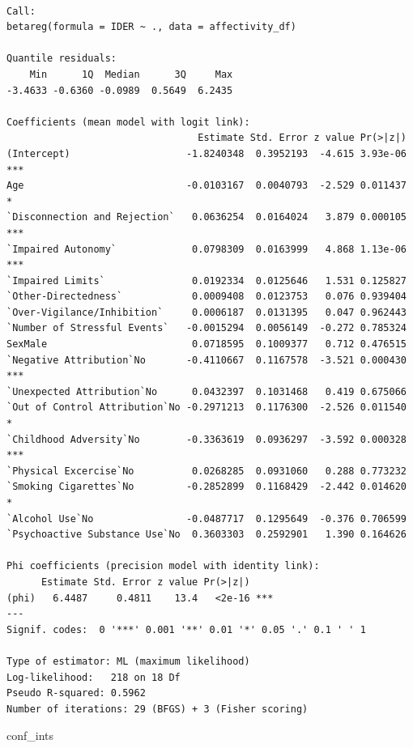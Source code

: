 \documentclass[
  letterpaper,
  DIV=11,
  numbers=noendperiod]{scrartcl}
\newenvironment{Shaded}{\begin{snugshade}}{\end{snugshade}}
\newcommand{\NormalTok}[1]{\textcolor[rgb]{0.00,0.23,0.31}{#1}}
\begin{document}
\begin{verbatim}

Call:
betareg(formula = IDER ~ ., data = affectivity_df)

Quantile residuals:
    Min      1Q  Median      3Q     Max 
-3.4633 -0.6360 -0.0989  0.5649  6.2435 

Coefficients (mean model with logit link):
                                 Estimate Std. Error z value Pr(>|z|)    
(Intercept)                    -1.8240348  0.3952193  -4.615 3.93e-06 ***
Age                            -0.0103167  0.0040793  -2.529 0.011437 *  
`Disconnection and Rejection`   0.0636254  0.0164024   3.879 0.000105 ***
`Impaired Autonomy`             0.0798309  0.0163999   4.868 1.13e-06 ***
`Impaired Limits`               0.0192334  0.0125646   1.531 0.125827    
`Other-Directedness`            0.0009408  0.0123753   0.076 0.939404    
`Over-Vigilance/Inhibition`     0.0006187  0.0131395   0.047 0.962443    
`Number of Stressful Events`   -0.0015294  0.0056149  -0.272 0.785324    
SexMale                         0.0718595  0.1009377   0.712 0.476515    
`Negative Attribution`No       -0.4110667  0.1167578  -3.521 0.000430 ***
`Unexpected Attribution`No      0.0432397  0.1031468   0.419 0.675066    
`Out of Control Attribution`No -0.2971213  0.1176300  -2.526 0.011540 *  
`Childhood Adversity`No        -0.3363619  0.0936297  -3.592 0.000328 ***
`Physical Excercise`No          0.0268285  0.0931060   0.288 0.773232    
`Smoking Cigarettes`No         -0.2852899  0.1168429  -2.442 0.014620 *  
`Alcohol Use`No                -0.0487717  0.1295649  -0.376 0.706599    
`Psychoactive Substance Use`No  0.3603303  0.2592901   1.390 0.164626    

Phi coefficients (precision model with identity link):
      Estimate Std. Error z value Pr(>|z|)    
(phi)   6.4487     0.4811    13.4   <2e-16 ***
---
Signif. codes:  0 '***' 0.001 '**' 0.01 '*' 0.05 '.' 0.1 ' ' 1 

Type of estimator: ML (maximum likelihood)
Log-likelihood:   218 on 18 Df
Pseudo R-squared: 0.5962
Number of iterations: 29 (BFGS) + 3 (Fisher scoring) 
\end{verbatim}

\begin{Shaded}
\begin{Highlighting}[]
\NormalTok{conf\_ints }
\end{Highlighting}
\end{Shaded}
\end{document}
